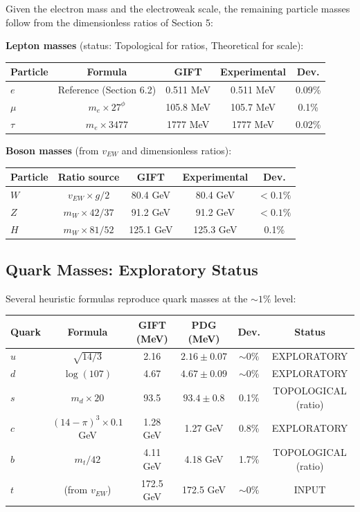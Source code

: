 \documentclass[11pt,a4paper]{article}
\newcommand{\EW}{\mathrm{EW}}
\newcommand{\topomark}{\textsc{Topological}}
\newcommand{\theoretical}{\textsc{Theoretical}}
\def\EW{EW}%
\def\topomark{Topological}%
\def\theoretical{Theoretical}%
\begin{document}
Given the electron mass and the electroweak scale, the remaining particle masses follow from the dimensionless ratios of Section 5:

\textbf{Lepton masses} (status: \topomark{} for ratios, \theoretical{} for scale):

\begin{table}[H]
\centering
\begin{tabular}{lcccc}
\toprule
Particle & Formula & GIFT & Experimental & Dev. \\
\midrule
$e$ & Reference (Section 6.2) & 0.511 MeV & 0.511 MeV & 0.09\% \\
$\mu$ & $m_e \times 27^\phi$ & 105.8 MeV & 105.7 MeV & 0.1\% \\
$\tau$ & $m_e \times 3477$ & 1777 MeV & 1777 MeV & 0.02\% \\
\bottomrule
\end{tabular}
\end{table}

\textbf{Boson masses} (from $v_{\EW}$ and dimensionless ratios):

\begin{table}[H]
\centering
\begin{tabular}{lcccc}
\toprule
Particle & Ratio source & GIFT & Experimental & Dev. \\
\midrule
$W$ & $v_{\EW} \times g/2$ & 80.4 GeV & 80.4 GeV & $<0.1\%$ \\
$Z$ & $m_W \times 42/37$ & 91.2 GeV & 91.2 GeV & $<0.1\%$ \\
$H$ & $m_W \times 81/52$ & 125.1 GeV & 125.3 GeV & 0.1\% \\
\bottomrule
\end{tabular}
\end{table}

\subsection{Quark Masses: Exploratory Status}

Several heuristic formulas reproduce quark masses at the $\sim 1\%$ level:

\begin{table}[H]
\centering
\small
\begin{tabular}{lccccc}
\toprule
Quark & Formula & GIFT (MeV) & PDG (MeV) & Dev. & Status \\
\midrule
$u$ & $\sqrt{14/3}$ & 2.16 & $2.16 \pm 0.07$ & $\sim 0\%$ & EXPLORATORY \\
$d$ & $\log(107)$ & 4.67 & $4.67 \pm 0.09$ & $\sim 0\%$ & EXPLORATORY \\
$s$ & $m_d \times 20$ & 93.5 & $93.4 \pm 0.8$ & 0.1\% & TOPOLOGICAL (ratio) \\
$c$ & $(14-\pi)^3 \times 0.1$ GeV & 1.28 GeV & 1.27 GeV & 0.8\% & EXPLORATORY \\
$b$ & $m_t / 42$ & 4.11 GeV & 4.18 GeV & 1.7\% & TOPOLOGICAL (ratio) \\
$t$ & (from $v_{\EW}$) & 172.5 GeV & 172.5 GeV & $\sim 0\%$ & INPUT \\
\bottomrule
\end{tabular}
\end{table}
\end{document}

